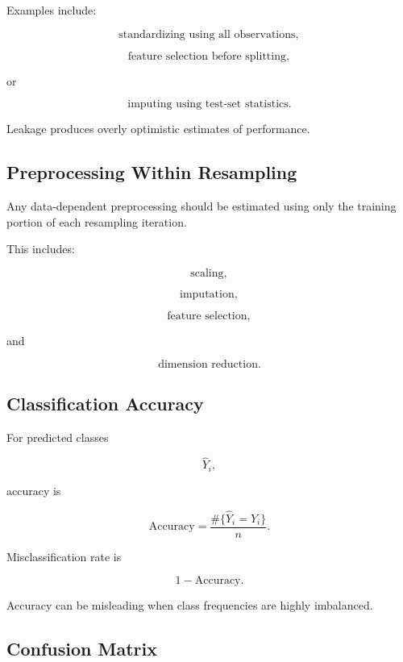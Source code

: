 Examples include:

\[
\boxed{
\text{standardizing using all observations},
}
\]

\[
\boxed{
\text{feature selection before splitting},
}
\]

or

\[
\boxed{
\text{imputing using test-set statistics}.
}
\]

Leakage produces overly optimistic estimates of performance.

\subsection{Preprocessing Within Resampling}
\label{subsec:preprocessing-within-resampling}

Any data-dependent preprocessing should be estimated using only the
training portion of each resampling iteration.

This includes:

\[
\boxed{
\text{scaling},
}
\]

\[
\boxed{
\text{imputation},
}
\]

\[
\boxed{
\text{feature selection},
}
\]

and

\[
\boxed{
\text{dimension reduction}.
}
\]

\subsection{Classification Accuracy}
\label{subsec:classification-accuracy}

For predicted classes

\[
\widehat{Y}_i,
\]

accuracy is

\[
\boxed{
\text{Accuracy}
=
\frac{
\#\{\widehat{Y}_i=Y_i\}
}{
n
}.
}
\]

Misclassification rate is

\[
\boxed{
1-\text{Accuracy}.
}
\]

Accuracy can be misleading when class frequencies are highly imbalanced.

\subsection{Confusion Matrix}
\label{subsec:confusion-matrix-learning}

